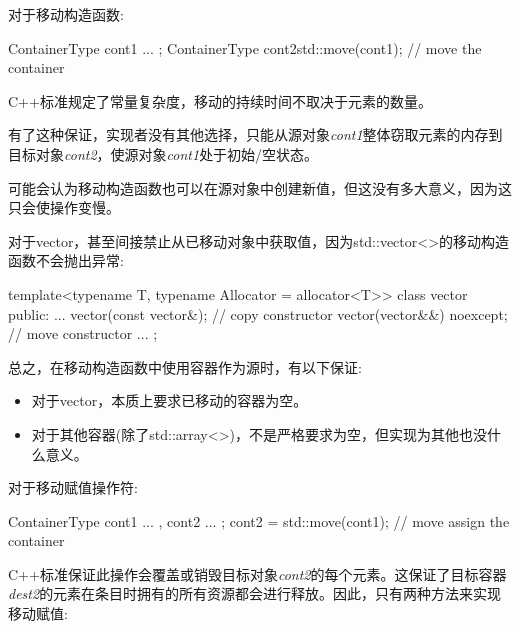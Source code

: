 对于移动构造函数:\par

\begin{codebox}[cpp]
ContainerType cont1{ ... };
ContainerType cont2{std::move(cont1)}; // move the container
\end{codebox}

C++标准规定了常量复杂度，移动的持续时间不取决于元素的数量。\par

有了这种保证，实现者没有其他选择，只能从源对象\textit{cont1}整体窃取元素的内存到目标对象\textit{cont2}，使源对象\textit{cont1}处于初始/空状态。\par

可能会认为移动构造函数也可以在源对象中创建新值，但这没有多大意义，因为这只会使操作变慢。\par

对于vector，甚至间接禁止从已移动对象中获取值，因为std::vector<>的移动构造函数不会抛出异常:\par

\begin{codebox}[cpp]
template<typename T, typename Allocator = allocator<T>>
class vector {
  public:
  ...
  vector(const vector&); // copy constructor
  vector(vector&&) noexcept; // move constructor
  ...
};
\end{codebox}

总之，在移动构造函数中使用容器作为源时，有以下保证:\par

\begin{itemize}
  \item 对于vector，本质上要求已移动的容器为空。
  \item 对于其他容器(除了std::array<>)，不是严格要求为空，但实现为其他也没什么意义。
\end{itemize}


对于移动赋值操作符:\par

\begin{codebox}[cpp]
ContainerType cont1{ ... }, cont2{ ... };
cont2 = std::move(cont1); // move assign the container
\end{codebox}

C++标准保证此操作会覆盖或销毁目标对象\textit{cont2}的每个元素。这保证了目标容器\textit{dest2}的元素在条目时拥有的所有资源都会进行释放。因此，只有两种方法来实现移动赋值:\par

